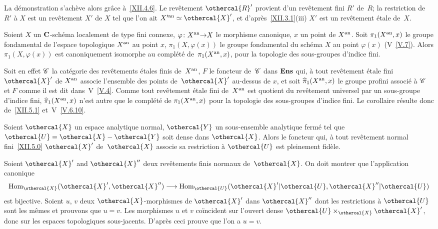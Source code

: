 La d\'emonstration s'ach\`eve alors gr\^ace \`a~\ref{XII.4.6}.
Le rev\^etement $\othercal{R}'$ provient d'un rev\^etement fini $R'$
de~$R$; la restriction de~$R'$ \`a $X$ est un rev\^etement $X'$ de
$X$ tel que l'on ait $X^{\prime\an}\simeq \othercal{X}'$, et
d'apr\`es~\ref{XII.3.1}(iii) $X'$ est un rev\^etement \'etale
de~$X$.

\begin{corollaire}
\label{XII.5.2}
Soient
$X$ un $\mathbf{C}$-sch\'ema localement de type fini connexe,
$\varphi\colon X^{\an}{\to} X$ le morphisme canonique, $x$ un point de
$X^{\mathrm{an}}$. Soit $\pi_{1}(X^{\mathrm{an}},x)$ le groupe fondamental de
l'espace topologique $X^{\mathrm{an}}$ au point $x$, $\pi_{1}(X,\varphi(x))$
le groupe fondamental du sch\'ema $X$ au point $\varphi(x)$
\textup{(V~\ref{V.7})}. Alors $\pi_{1}(X,\varphi(x))$ est canoniquement
isomorphe au compl\'et\'e de~$\pi_{1}(X^{\mathrm{an}},x)$, pour la
topologie des sous-groupes d'indice fini.
\end{corollaire}

Soit en effet $\cal{C}$ la cat\'egorie des rev\^etements
\'etales finis de~$X^{\mathrm{an}}$, $F$ le foncteur de~$\cal{C}$ dans
$\mathbf{Ens}$ qui, \`a tout rev\^etement \'etale fini $\othercal{X}'$ de
$X^{\mathrm{an}}$ associe l'ensemble des points de~$\othercal{X}'$ au-dessus de
$x$, et soit $\widehat{\pi}_{1}(X^{\mathrm{an}},x)$ le groupe profini
associ\'e \`a $\cal{C}$ et $F$ comme il est dit dans~V~\ref{V.4}.
Comme tout rev\^etement \'etale fini de~$X^{\mathrm{an}}$ est quotient du
rev\^etement universel par un sous-groupe d'indice fini,
$\widehat{\pi}_{1}(X^{\mathrm{an}},x)$ n'est autre que le compl\'et\'e de
$\pi_{1}(X^{\mathrm{an}},x)$ pour la topologie des sous-groupes d'indice fini.
Le corollaire r\'esulte donc de~\ref{XII.5.1} et~V~\ref{V.6.10}.

\begin{proposition}
\label{XII.5.3}
Soient $\othercal{X}$ un espace analytique normal, $\othercal{Y}$ un
sous-ensemble analytique ferm\'e tel que
$\othercal{U}=\othercal{X}-\othercal{Y}$ soit dense dans $\othercal{X}$.
Alors le foncteur qui, \`a tout rev\^etement normal
fini~\eqref{XII.5.0} $\othercal{X}'$ de~$\othercal{X}$ associe sa restriction
\`a $\othercal{U}$ est pleinement fid\`ele.
\end{proposition}

Soient $\othercal{X}'$ and $\othercal{X}''$ deux rev\^etements finis normaux
de~$\othercal{X}$. On doit montrer que l'application canonique
$$
\Hom_{\othercal{X}}(\othercal{X}',\othercal{X}'') \to
\Hom_{\othercal{U}}(\othercal{X}'|\othercal{U},\othercal{X}''|\othercal{U})
$$
est bijective. Soient $u$, $v$ deux $\othercal{X}$-morphismes de
$\othercal{X}'$ dans $\othercal{X}''$ dont les restrictions \`a $\othercal{U}$
sont les m\^emes et prouvons que $u=v$. Les morphismes $u$ et
$v$ co\"incident sur l'ouvert dense
$\othercal{U}\times_{\othercal{X}}\othercal{X}'$, donc sur les espaces
topologiques sous-jacents. D'apr\`es \hbox{\cite[~\S 4~cor.\, 5]{XII.4}} ceci
prouve que l'on a $u=v$.

